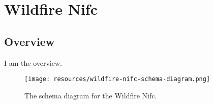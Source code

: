 
\section{Wildfire Nifc}
\label{sec:wildfire-nifc}
\subsection{Overview}
\label{ssec:overview}

I am the overview.

\begin{figure}[h!]
  \begin{center}
    \texttt{[image: resources/wildfire-nifc-schema-diagram.png]}
  \end{center}
  \caption{The schema diagram for the Wildfire Nifc.}
  \label{fig:ov-diagram}
\end{figure}


